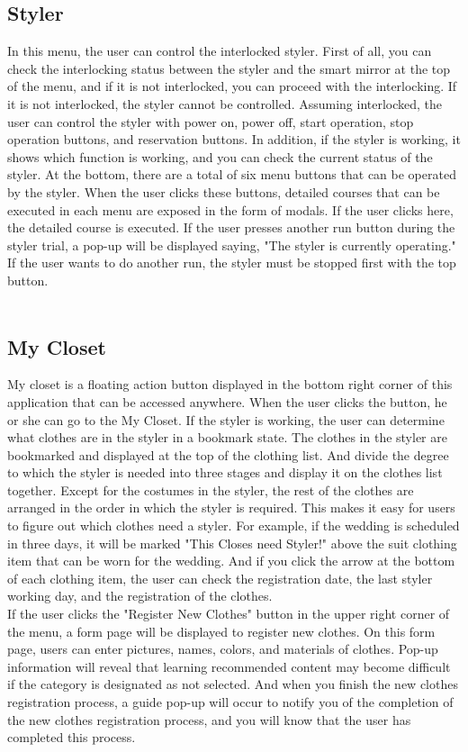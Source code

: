 \documentclass[conference]{IEEEtran}
\begin{document}
\subsection{Styler}
In this menu, the user can control the interlocked styler. First of all, you can check the interlocking status between the styler and the smart mirror at the top of the menu, and if it is not interlocked, you can proceed with the interlocking. If it is not interlocked, the styler cannot be controlled. Assuming interlocked, the user can control the styler with power on, power off, start operation, stop operation buttons, and reservation buttons. In addition, if the styler is working, it shows which function is working, and you can check the current status of the styler. At the bottom, there are a total of six menu buttons that can be operated by the styler. When the user clicks these buttons, detailed courses that can be executed in each menu are exposed in the form of modals. If the user clicks here, the detailed course is executed. If the user presses another run button during the styler trial, a pop-up will be displayed saying, "The styler is currently operating." If the user wants to do another run, the styler must be stopped first with the top button. \\ \\

\subsection{My Closet}
My closet is a floating action button displayed in the bottom right corner of this application that can be accessed anywhere. When the user clicks the button, he or she can go to the My Closet. If the styler is working, the user can determine what clothes are in the styler in a bookmark state. The clothes in the styler are bookmarked and displayed at the top of the clothing list. And divide the degree to which the styler is needed into three stages and display it on the clothes list together. Except for the costumes in the styler, the rest of the clothes are arranged in the order in which the styler is required. This makes it easy for users to figure out which clothes need a styler. For example, if the wedding is scheduled in three days, it will be marked "This Closes need Styler!" above the suit clothing item that can be worn for the wedding. And if you click the arrow at the bottom of each clothing item, the user can check the registration date, the last styler working day, and the registration of the clothes.\\
If the user clicks the "Register New Clothes" button in the upper right corner of the menu, a form page will be displayed to register new clothes. On this form page, users can enter pictures, names, colors, and materials of clothes. Pop-up information will reveal that learning recommended content may become difficult if the category is designated as not selected. And when you finish the new clothes registration process, a guide pop-up will occur to notify you of the completion of the new clothes registration process, and you will know that the user has completed this process.\\ \\
\end{document}
